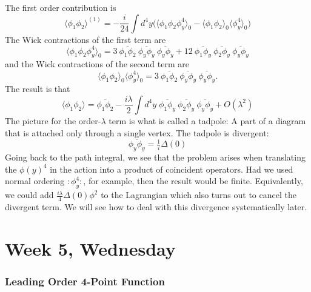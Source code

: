 The first order contribution is
\begin{equation}
  \langle \phi_1 \phi_2 \rangle^{(1)} = 
  - \frac{i}{24} \int d^4y \Big(
  \langle \phi_1 \phi_2 \phi_y^4 \rangle_0 - 
  \langle \phi_1 \phi_2  \rangle_0 
  \langle \phi_y^4 \rangle_0 
  \Big)
\end{equation}
The Wick contractions of the first term are
\begin{equation}
  \langle \phi_1 \phi_2 \phi_y^4 \rangle_0 = 
  3~
  \overline{\phi_1 \phi_2}~
  \overline{\phi_y \phi_y}~
  \overline{\phi_y \phi_y}
  + 
  12~
  \overline{\phi_1 \phi_y}~
  \overline{\phi_2 \phi_y}~
  \overline{\phi_y \phi_y}
\end{equation}
and the Wick contractions of the second term are
\begin{equation}
  \langle \phi_1 \phi_2 \rangle_0
  \langle \phi_y^4 \rangle_0 = 
  3~
  \overline{\phi_1 \phi_2}~
  \overline{\phi_y \phi_y}~
  \overline{\phi_y \phi_y}.
\end{equation}
The result is that
\begin{equation}
  \langle \phi_1 \phi_2 \rangle  =
  \overline{\phi_1\phi_2}
  - \frac{i\lambda}{2} \int d^4y\;
  \overline{\phi_1 \phi_y}~
  \overline{\phi_2 \phi_y}~
  \overline{\phi_y \phi_y} 
  + O(\lambda^2)
\end{equation}
The picture for the order-$\lambda$ term is what is called a tadpole: A
part of a diagram that is attached only through a single vertex. The
tadpole is divergent:
\begin{equation}
  \overline{\phi_y \phi_y} 
  = \tfrac{1}{i} \Delta(0)
\end{equation}
Going back to the path integral, we see that the problem arises when
translating the $\phi(y)^4$ in the action into a product of coincident
operators. Had we used normal ordering $:\phi_y^4:$, for example, then
the result would be finite. Equivalently, we could add
$\frac{i\lambda}{4}\Delta(0)\phi^2$ to the Lagrangian which also turns
out to cancel the divergent term. We will see how to deal with this
divergence systematically later.


\section{Week 5, Wednesday}

\subsubsection{Leading Order 4-Point Function}

